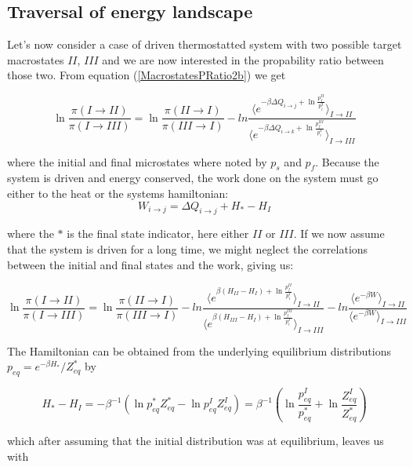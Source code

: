 \documentclass[a4paper,12pt]{article}
\begin{document}
\subsection{Traversal of energy landscape }

Let's now consider a case of driven thermostatted system with two possible target macrostates $II$, $III$ and we are now interested in the propability ratio between those two. From equation (\ref{MacrostatesPRatio2b}) we  get

\begin{equation}
  \ln \frac{\pi(I \to II)}{\pi(I \to III)} = \ln \frac{\pi(II \to I)}{\pi(III \to I)}- ln \frac{ \langle e^{-\beta \Delta Q_{i \to j} + \ln \frac{p_f^{II}}{p_i^{I}}} \rangle_{I \to II}}{ \langle e^{-\beta \Delta Q_{i \to k} + \ln \frac{p_f^{III}}{p_i^{I}}} \rangle_{I \to III}}
\end{equation}

where the initial and final microstates where noted by $p_s$ and $p_f$.
Because the system is driven and energy conserved, the work done on the system must go either to the heat or the systems hamiltonian:
\begin{equation}
  W_{i \to j}=  \Delta Q_{i \to j} + H_*- H_I
\end{equation}

where the $*$ is the final state indicator, here either $II$ or $III$.
If we now assume that the system is driven for a long time, we might neglect the correlations between the initial and final states and the work, giving us:

\begin{equation}
  \ln \frac{\pi(I \to II)}{\pi(I \to III)} = \ln \frac{\pi(II \to I)}{\pi(III \to I)}- ln \frac{ \langle e^{\beta (H_{II}-H_I) + \ln \frac{p_f^{II}}{p_i^{I}}} \rangle_{I \to II}}{ \langle e^{\beta (H_{III}-H_I) + \ln \frac{p_f^{III}}{p_i^{I}}} \rangle_{I \to III}}-ln \frac{\langle e^{ - \beta W} \rangle_{I \to II}}{\langle e^{ - \beta W} \rangle_{I \to III}}
\end{equation}

The Hamiltonian can be obtained from the underlying equilibrium distributions $p_{eq}= e^{-\beta H_*}/Z_{eq}^*$ by

\begin{equation}
  H_*-H_I= -\beta^{-1}( \ln{p_{eq}^* Z_{eq}^*} -  \ln{p_{eq}^I Z_{eq}^I})= \beta^{-1}( \ln{\frac{p_{eq}^I}{p_{eq}^*}} + \ln{\frac{Z_{eq}^I}{Z_{eq}^*}})
\end{equation}

which after assuming that the initial distribution was at equilibrium, leaves us with 
\end{document}
